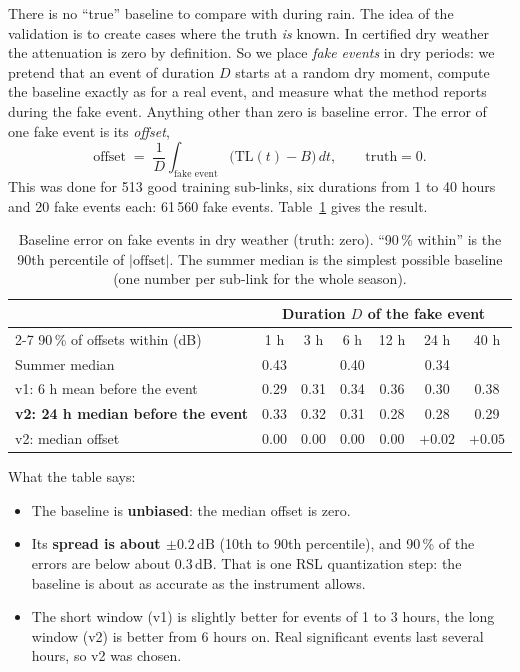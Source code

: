 \documentclass[11pt,a4paper]{article}
\newcommand{\dB}{\,\mathrm{dB}}
\begin{document}
There is no ``true'' baseline to compare with during rain. The idea of the validation is to create cases where the
truth \emph{is} known. In certified dry weather the attenuation is zero by definition. So we place \emph{fake events}
in dry periods: we pretend that an event of duration $D$ starts at a random dry moment, compute the baseline exactly as
for a real event, and measure what the method reports during the fake event. Anything other than zero is baseline
error. The error of one fake event is its \emph{offset},
\begin{equation}
\text{offset} \;=\; \frac{1}{D}\int_{\text{fake event}} \bigl(\mathrm{TL}(t) - B\bigr)\,dt , \qquad \text{truth} = 0 .
\end{equation}
This was done for 513 good training sub-links, six durations from 1 to 40 hours and 20 fake events each: 61\,560 fake
events. Table~\ref{tab:offset} gives the result.

\begin{table}[H]
\centering
\caption{Baseline error on fake events in dry weather (truth: zero). ``90\,\% within'' is the 90th percentile of
$|\text{offset}|$. The summer median is the simplest possible baseline (one number per sub-link for the whole
season).}
\label{tab:offset}
\small
\begin{tabular}{@{}lcccccc@{}}
\toprule
 & \multicolumn{6}{c}{Duration $D$ of the fake event} \\
\cmidrule(l){2-7}
90\,\% of offsets within (dB) & 1 h & 3 h & 6 h & 12 h & 24 h & 40 h \\
\midrule
Summer median & 0.43 & & 0.40 & & 0.34 & \\
v1: 6 h mean before the event & 0.29 & 0.31 & 0.34 & 0.36 & 0.30 & 0.38 \\
\textbf{v2: 24 h median before the event} & 0.33 & 0.32 & 0.31 & 0.28 & 0.28 & 0.29 \\
\midrule
v2: median offset & $0.00$ & $0.00$ & $0.00$ & $0.00$ & $+0.02$ & $+0.05$ \\
\bottomrule
\end{tabular}
\end{table}

What the table says:
\begin{itemize}
\item The baseline is \textbf{unbiased}: the median offset is zero.
\item Its \textbf{spread is about $\pm 0.2\dB$} (10th to 90th percentile), and 90\,\% of the errors are below about
$0.3\dB$. That is one RSL quantization step: the baseline is about as accurate as the instrument allows.
\item The short window (v1) is slightly better for events of 1 to 3 hours, the long window (v2) is better from 6
hours on. Real significant events last several hours, so v2 was chosen.
\end{itemize}
\end{document}
